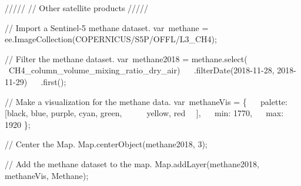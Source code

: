 \documentclass[
  letterpaper,
  DIV=11,
  numbers=noendperiod]{scrreprt}
\newenvironment{Shaded}{\begin{snugshade}}{\end{snugshade}}
\newcommand{\AttributeTok}[1]{\textcolor[rgb]{0.40,0.45,0.13}{#1}}
\newcommand{\BuiltInTok}[1]{\textcolor[rgb]{0.00,0.23,0.31}{#1}}
\newcommand{\CommentTok}[1]{\textcolor[rgb]{0.37,0.37,0.37}{#1}}
\newcommand{\DataTypeTok}[1]{\textcolor[rgb]{0.68,0.00,0.00}{#1}}
\newcommand{\DecValTok}[1]{\textcolor[rgb]{0.68,0.00,0.00}{#1}}
\newcommand{\FunctionTok}[1]{\textcolor[rgb]{0.28,0.35,0.67}{#1}}
\newcommand{\NormalTok}[1]{\textcolor[rgb]{0.00,0.23,0.31}{#1}}
\newcommand{\OperatorTok}[1]{\textcolor[rgb]{0.37,0.37,0.37}{#1}}
\newcommand{\StringTok}[1]{\textcolor[rgb]{0.13,0.47,0.30}{#1}}
\begin{document}
\begin{Shaded}
\begin{Highlighting}[]
\CommentTok{/////  }
\CommentTok{// Other satellite products  }
\CommentTok{/////  }
  
\CommentTok{// Import a Sentinel{-}5 methane dataset.  }
\NormalTok{var methane }\OperatorTok{=}\NormalTok{ ee}\OperatorTok{.}\FunctionTok{ImageCollection}\NormalTok{(}\StringTok{\textquotesingle{}COPERNICUS/S5P/OFFL/L3\_CH4\textquotesingle{}}\NormalTok{)}\OperatorTok{;}  
  
\CommentTok{// Filter the methane dataset.  }
\NormalTok{var methane2018 }\OperatorTok{=}\NormalTok{ methane}\OperatorTok{.}\FunctionTok{select}\NormalTok{(       }\StringTok{\textquotesingle{}CH4\_column\_volume\_mixing\_ratio\_dry\_air\textquotesingle{}}\NormalTok{)  }
  \AttributeTok{ }\OperatorTok{.}\FunctionTok{filterDate}\NormalTok{(}\StringTok{\textquotesingle{}2018{-}11{-}28\textquotesingle{}}\OperatorTok{,} \StringTok{\textquotesingle{}2018{-}11{-}29\textquotesingle{}}\NormalTok{)  }
  \AttributeTok{ }\OperatorTok{.}\FunctionTok{first}\NormalTok{()}\OperatorTok{;}  
  
\CommentTok{// Make a visualization for the methane data.  }
\NormalTok{var methaneVis }\OperatorTok{=}\NormalTok{ \{  }
  \DataTypeTok{ palette}\OperatorTok{:}\NormalTok{ [}\StringTok{\textquotesingle{}black\textquotesingle{}}\OperatorTok{,} \StringTok{\textquotesingle{}blue\textquotesingle{}}\OperatorTok{,} \StringTok{\textquotesingle{}purple\textquotesingle{}}\OperatorTok{,} \StringTok{\textquotesingle{}cyan\textquotesingle{}}\OperatorTok{,} \StringTok{\textquotesingle{}green\textquotesingle{}}\OperatorTok{,}       \StringTok{\textquotesingle{}yellow\textquotesingle{}}\OperatorTok{,} \StringTok{\textquotesingle{}red\textquotesingle{}}\NormalTok{   ]}\OperatorTok{,}  
  \DataTypeTok{ min}\OperatorTok{:} \DecValTok{1770}\OperatorTok{,}  
  \DataTypeTok{ max}\OperatorTok{:} \DecValTok{1920}  
\NormalTok{\}}\OperatorTok{;}  
  
\CommentTok{// Center the Map.  }
\BuiltInTok{Map}\OperatorTok{.}\FunctionTok{centerObject}\NormalTok{(methane2018}\OperatorTok{,} \DecValTok{3}\NormalTok{)}\OperatorTok{;}  
  
\CommentTok{// Add the methane dataset to the map.  }
\BuiltInTok{Map}\OperatorTok{.}\FunctionTok{addLayer}\NormalTok{(methane2018}\OperatorTok{,}\NormalTok{ methaneVis}\OperatorTok{,} \StringTok{\textquotesingle{}Methane\textquotesingle{}}\NormalTok{)}\OperatorTok{;}
\end{Highlighting}
\end{Shaded}
\end{document}
